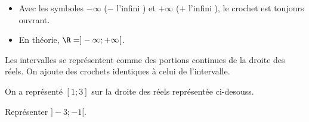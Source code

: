 \documentclass{article}
\begin{document}
\begin{remark}
\hfill

\begin{itemize}
\item Avec les symboles $- \infty$ (\og $-$ l'infini \fg) et $+ \infty$ (\og $+$ l'infini \fg), le crochet est toujours ouvrant.
\item En théorie, $\R = ]-\infty; +\infty[$.
\end{itemize}
\end{remark}
\begin{remark}
Les intervalles se représentent comme des portions continues de la droite des réels. On ajoute des crochets identiques à celui de l'intervalle.

On a représenté $[1;3]$ sur la droite des réels représentée ci-desouss. 

Représenter $]-3;-1[$.
\begin{center}
\end{center}
\end{remark}
\newpage
\end{document}
